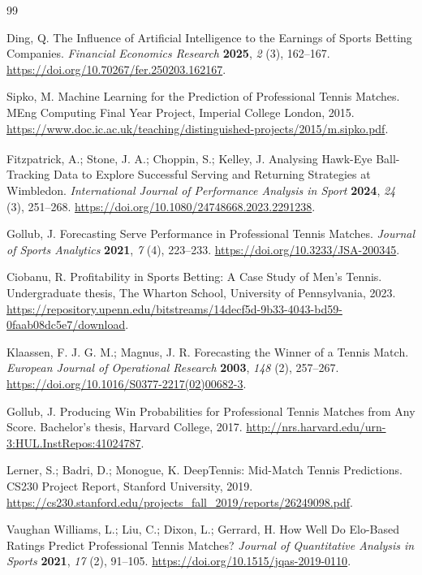 \documentclass[10pt,twocolumn]{article}
\begin{document}
\begin{thebibliography}{99}
\small

Ding, Q. The Influence of Artificial Intelligence to the Earnings of Sports Betting Companies. \emph{Financial Economics Research} \textbf{2025}, \emph{2} (3), 162--167. \url{https://doi.org/10.70267/fer.250203.162167}.

Sipko, M. Machine Learning for the Prediction of Professional Tennis Matches. MEng Computing Final Year Project, Imperial College London, 2015. \url{https://www.doc.ic.ac.uk/teaching/distinguished-projects/2015/m.sipko.pdf}.

Fitzpatrick, A.; Stone, J. A.; Choppin, S.; Kelley, J. Analysing Hawk-Eye\textsuperscript{\textregistered} Ball-Tracking Data to Explore Successful Serving and Returning Strategies at Wimbledon. \emph{International Journal of Performance Analysis in Sport} \textbf{2024}, \emph{24} (3), 251--268. \url{https://doi.org/10.1080/24748668.2023.2291238}.

Gollub, J. Forecasting Serve Performance in Professional Tennis Matches. \emph{Journal of Sports Analytics} \textbf{2021}, \emph{7} (4), 223--233. \url{https://doi.org/10.3233/JSA-200345}.

Ciobanu, R. Profitability in Sports Betting: A Case Study of Men's Tennis. Undergraduate thesis, The Wharton School, University of Pennsylvania, 2023. \url{https://repository.upenn.edu/bitstreams/14decf5d-9b33-4043-bd59-0faab08dc5e7/download}.

Klaassen, F. J. G. M.; Magnus, J. R. Forecasting the Winner of a Tennis Match. \emph{European Journal of Operational Research} \textbf{2003}, \emph{148} (2), 257--267. \url{https://doi.org/10.1016/S0377-2217(02)00682-3}.

Gollub, J. Producing Win Probabilities for Professional Tennis Matches from Any Score. Bachelor's thesis, Harvard College, 2017. \url{http://nrs.harvard.edu/urn-3:HUL.InstRepos:41024787}.

Lerner, S.; Badri, D.; Monogue, K. DeepTennis: Mid-Match Tennis Predictions. CS230 Project Report, Stanford University, 2019. \url{https://cs230.stanford.edu/projects_fall_2019/reports/26249098.pdf}.

Vaughan Williams, L.; Liu, C.; Dixon, L.; Gerrard, H. How Well Do Elo-Based Ratings Predict Professional Tennis Matches? \emph{Journal of Quantitative Analysis in Sports} \textbf{2021}, \emph{17} (2), 91--105. \url{https://doi.org/10.1515/jqas-2019-0110}.


\end{thebibliography}
\end{document}
